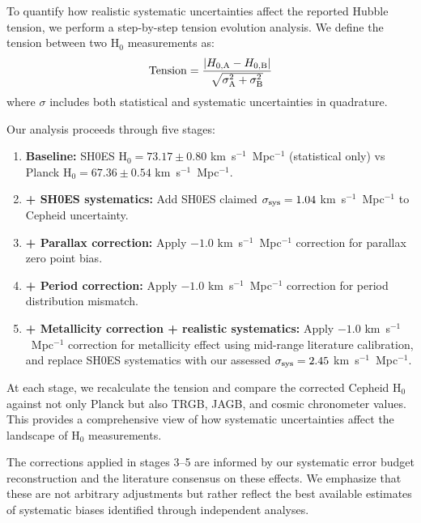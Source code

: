 \documentclass[twocolumn, linenumbers]{aastex701}
\begin{document}
To quantify how realistic systematic uncertainties affect the reported Hubble tension, we perform a step-by-step tension evolution analysis. We define the tension between two H$_0$ measurements as:
\begin{equation}
{\rm Tension} = \frac{|H_{0,\rm A} - H_{0,\rm B}|}{\sqrt{\sigma_{\rm A}^2 + \sigma_{\rm B}^2}}
\end{equation}
where $\sigma$ includes both statistical and systematic uncertainties in quadrature.

Our analysis proceeds through five stages:

\begin{enumerate}
\item \textbf{Baseline:} SH0ES H$_0 = 73.17 \pm 0.80$ km~s$^{-1}$~Mpc$^{-1}$ (statistical only) vs Planck H$_0 = 67.36 \pm 0.54$ km~s$^{-1}$~Mpc$^{-1}$.

\item \textbf{+ SH0ES systematics:} Add SH0ES claimed $\sigma_{\rm sys} = 1.04$ km~s$^{-1}$~Mpc$^{-1}$ to Cepheid uncertainty.

\item \textbf{+ Parallax correction:} Apply $-1.0$ km~s$^{-1}$~Mpc$^{-1}$ correction for parallax zero point bias.

\item \textbf{+ Period correction:} Apply $-1.0$ km~s$^{-1}$~Mpc$^{-1}$ correction for period distribution mismatch.

\item \textbf{+ Metallicity correction + realistic systematics:} Apply $-1.0$ km~s$^{-1}$~Mpc$^{-1}$ correction for metallicity effect using mid-range literature calibration, and replace SH0ES systematics with our assessed $\sigma_{\rm sys} = 2.45$ km~s$^{-1}$~Mpc$^{-1}$.
\end{enumerate}

At each stage, we recalculate the tension and compare the corrected Cepheid H$_0$ against not only Planck but also TRGB, JAGB, and cosmic chronometer values. This provides a comprehensive view of how systematic uncertainties affect the landscape of H$_0$ measurements.

The corrections applied in stages 3--5 are informed by our systematic error budget reconstruction and the literature consensus on these effects. We emphasize that these are not arbitrary adjustments but rather reflect the best available estimates of systematic biases identified through independent analyses.

\end{document}
